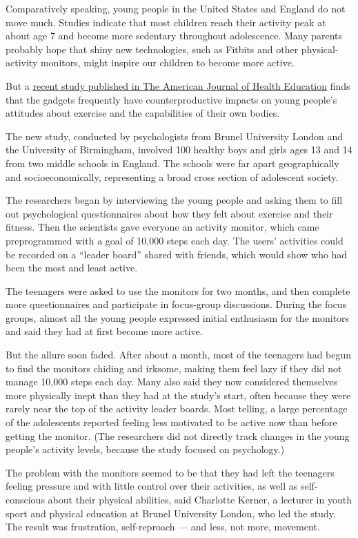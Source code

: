 Comparatively speaking, young people in the United States and England do
not move much. Studies indicate that most children reach their activity
peak at about age 7 and become more sedentary throughout adolescence.
Many parents probably hope that shiny new technologies, such as Fitbits
and other physical-activity monitors, might inspire our children to
become more active.

But a
\href{http://www.tandfonline.com/doi/abs/10.1080/19325037.2017.1343161}{recent
study published in The American Journal of Health Education} finds that
the gadgets frequently have counterproductive impacts on young people's
attitudes about exercise and the capabilities of their own bodies.

The new study, conducted by psychologists from Brunel University London
and the University of Birmingham, involved 100 healthy boys and girls
ages 13 and 14 from two middle schools in England. The schools were far
apart geographically and socioeconomically, representing a broad cross
section of adolescent society.

The researchers began by interviewing the young people and asking them
to fill out psychological questionnaires about how they felt about
exercise and their fitness. Then the scientists gave everyone an
activity monitor, which came preprogrammed with a goal of 10,000 steps
each day. The users' activities could be recorded on a ``leader board''
shared with friends, which would show who had been the most and least
active.

The teenagers were asked to use the monitors for two months, and then
complete more questionnaires and participate in focus-group discussions.
During the focus groups, almost all the young people expressed initial
enthusiasm for the monitors and said they had at first become more
active.

But the allure soon faded. After about a month, most of the teenagers
had begun to find the monitors chiding and irksome, making them feel
lazy if they did not manage 10,000 steps each day. Many also said they
now considered themselves more physically inept than they had at the
study's start, often because they were rarely near the top of the
activity leader boards. Most telling, a large percentage of the
adolescents reported feeling less motivated to be active now than before
getting the monitor. (The researchers did not directly track changes in
the young people's activity levels, because the study focused on
psychology.)

The problem with the monitors seemed to be that they had left the
teenagers feeling pressure and with little control over their
activities, as well as self-conscious about their physical abilities,
said Charlotte Kerner, a lecturer in youth sport and physical education
at Brunel University London, who led the study. The result was
frustration, self-reproach --- and less, not more, movement.

